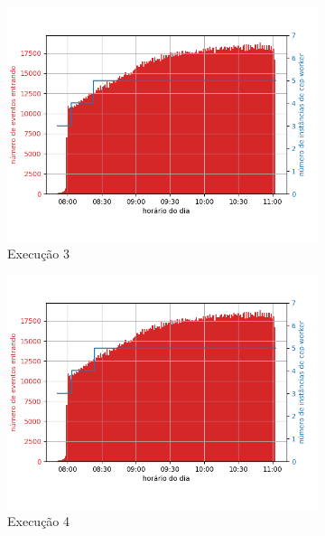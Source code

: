 \begin{figure}[h!]
\begin{subfigure}{.5\textwidth}
  \centering
  \includegraphics[width=\linewidth]{figuras/graphics/carga_e_workers_horario8-dez-su.png}  
  \caption{Execução 3}
  \label{fig:cewh-8-dez-su}
\end{subfigure}
\begin{subfigure}{.5\textwidth}
  \centering
  \includegraphics[width=\linewidth]{figuras/graphics/carga_e_workers_horario9-dez-su.png}  
  \caption{Execução 4}
  \label{fig:scewh-9-dez-su}
\end{subfigure}
\begin{subfigure}{.5\textwidth}
  \centering

\end{subfigure}
\end{figure}

